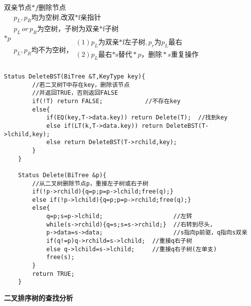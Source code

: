 \documentclass[UTF8]{ctexart}
\newcommand{\mt}[1]{\text{#1}}
\newcommand{\mb}[1]{\textbf{#1}}
\newcommand{\p}{\par}
\newcommand{\ma}[1]{\begin{array}{llll} #1 \end{array}}
\begin{document}
双亲节点$*f$删除节点$*p\ma{
    p_L,p_R\mt{均为空树,改双*f亲指针}\\
    p_L \, or \, p_R\mt{为空树，子树为双亲*f子树}\\
    p_L,p_R\mt{均不为空树，}\ma{
        (1)p_L\mt{为双亲*f左子树},p_r\mt{为}p_L\mt{最右}\\
        (2)p_L\mt{最右*s替代}*p，\mt{删除}*s\mt{重复操作}\\
    }
}$


 \begin{lstlisting}[style=v1]
    Status DeleteBST(BiTree &T,KeyType key){
        //若二叉树T中存在key，删除该节点
        //并返回TRUE，否则返回FALSE
        if(!T) return FALSE;            //不存在key
        else{
            if(EQ(key,T->data.key)) return Delete(T);  //找到key
            else if(LT(k,T->data.key)) return DeleteBST(T->lchild,key);
            else return DeleteBST(T->rchild,key); 
        }
    }

    Status Delete(BiTree &p){
        //从二叉树删除节点p，重接左子树或右子树
        if(!p->rchild){q=p;p=p->lchild;free(q);}
        else if(!p->lchild){q=p;p=p->rchild;free(q);}
        else{
            q=p;s=p->lchild;                    //左转
            while(s->rchild){q=s;s=s->rchild;}  //右转到尽头，
            p->data=s->data;                    //s指向p前驱，q指向s双亲
            if(q!=p)q->rchild=s->lchild;  //重接q右子树  
            else q->lchild=s->lchild;     //重接q右子树(左单支)
            free(s);
        }
        return TRUE;
    }
 \end{lstlisting}

\mb{二叉排序树的查找分析}\p
\end{document}
